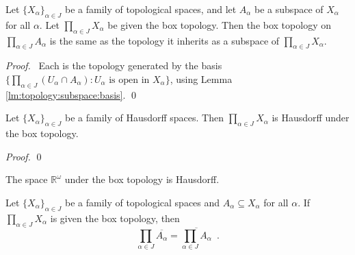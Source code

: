 \begin{thm}
  Let $\{X_\alpha\}_{\alpha \in J}$ be a family of topological spaces, and
  let $A_\alpha$ be a subspace of $X_\alpha$ for all $\alpha$. Let
  $\prod_{\alpha \in J} X_\alpha$ be given the box topology. Then the box
  topology on $\prod_{\alpha \in J} A_\alpha$ is the same as the topology it
  inherits as a subspace of $\prod_{\alpha \in J} X_\alpha$.
\end{thm}

\begin{proof}
  \pf\ Each is the topology generated by the basis \\$\{ \prod_{\alpha \in J}
  (U_\alpha \cap A_\alpha) : U_\alpha \text{ is open in } X_\alpha \}$, using
  Lemma \ref{lm:topology:subspace:basis}. \qed
\end{proof}

\begin{thm}
  Let $\{ X_\alpha \}_{\alpha \in J}$ be a family of Hausdorff spaces. Then
  $\prod_{\alpha \in J} X_\alpha$ is Hausdorff under the box topology.
\end{thm}

\begin{proof}
  \pf
  \qed
\end{proof}

\begin{cor}
  The space $\mathbb{R}^\omega$ under the box topology is Hausdorff.
\end{cor}

\begin{thm}[AC]
  Let $\{ X_\alpha \}_{\alpha \in J}$ be a family of topological spaces and
  $A_\alpha \subseteq X_\alpha$ for all $\alpha$. If $\prod_{\alpha \in J}
  X_\alpha$ is given the box topology, then
  \[ \prod_{\alpha \in J} \overline{A_\alpha} = \overline{\prod_{\alpha \in
      J}
    A_\alpha} \enspace . \]
\end{thm}

